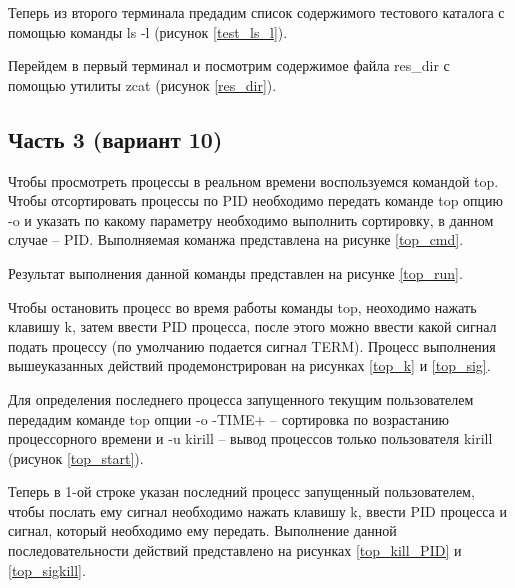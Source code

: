 Теперь из второго терминала предадим список содержимого тестового каталога с помощью команды ls -l (рисунок \ref{test_ls_l}).


Перейдем в первый терминал и посмотрим содержимое файла res\_dir с помощью утилиты zcat (рисунок \ref{res_dir}).


\subsection{Часть 3 (вариант 10)}

Чтобы просмотреть процессы в реальном времени воспользуемся командой top. Чтобы отсортировать процессы по PID необходимо передать команде top опцию -o и указать по какому параметру необходимо выполнить сортировку, в данном случае -- PID. Выполняемая команжа представлена на рисунке \ref{top_cmd}.


Результат выполнения данной команды представлен на рисунке \ref{top_run}. 


Чтобы остановить процесс во время работы команды top, неоходимо нажать клавишу k, затем ввести PID процесса, после этого можно ввести какой сигнал подать процессу (по умолчанию подается сигнал TERM). Процесс выполнения вышеуказанных действий продемонстрирован на рисунках \ref{top_k} и \ref{top_sig}.


Для определения последнего процесса запущенного текущим пользователем передадим команде top опции -o -TIME+ -- сортировка по возрастанию процессорного времени и -u kirill -- вывод процессов только пользователя kirill (рисунок \ref{top_start}).

Теперь в 1-ой строке указан последний процесс запущенный пользователем, чтобы послать ему сигнал необходимо нажать клавишу k, ввести PID процесса и сигнал, который необходимо ему передать. Выполнение данной последовательности действий представлено на рисунках \ref{top_kill_PID} и \ref{top_sigkill}.

